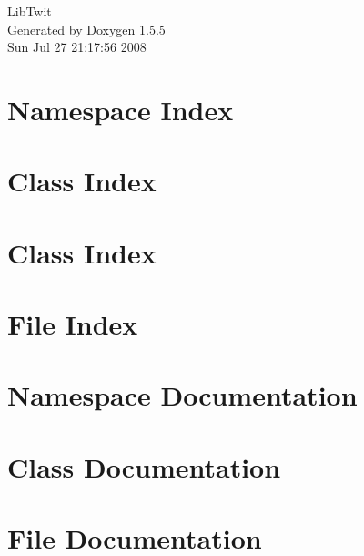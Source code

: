 \documentclass[a4paper]{book}
\begin{document}
\begin{titlepage}
\vspace*{7cm}
\begin{center}
{\Large LibTwit }\\
\vspace*{1cm}
{\large Generated by Doxygen 1.5.5}\\
\vspace*{0.5cm}
{\small Sun Jul 27 21:17:56 2008}\\
\end{center}
\end{titlepage}
\clearemptydoublepage
{}
\tableofcontents
\clearemptydoublepage
{}
\chapter{Namespace Index}

\chapter{Class Index}

\chapter{Class Index}

\chapter{File Index}

\chapter{Namespace Documentation}

\chapter{Class Documentation}









\chapter{File Documentation}







\printindex
\end{document}
